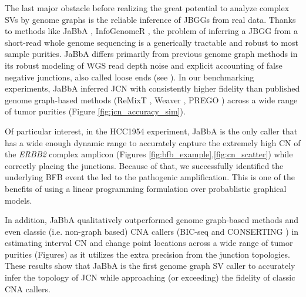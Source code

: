\documentclass[phd,tocprelim]{cornell}
\begin{document}

The last major obstacle before realizing the great potential to analyze complex SVs by genome graphs is the reliable inference of JBGGs from real data. Thanks to methods like JaBbA \cite{Hadi2020-um}, InfoGenomeR \cite{Lee2021-rl}, the problem of inferring a JBGG from a short-read whole genome sequencing is a generically tractable and robust to most sample purities. JaBbA differs primarily from previous genome graph methods in its robust modeling of WGS read depth noise and explicit accounting of false negative junctions, also called loose ends (see ). In our benchmarking experiments, JaBbA inferred JCN with consistently higher fidelity than published genome graph-based methods (ReMixT \cite{McPherson2017-ry}, Weaver \cite{Li2016-qa}, PREGO \cite{Oesper2012-vw}) across a wide range of tumor purities (Figure \ref{fig:jcn_accuracy_sim}).

Of particular interest, in the HCC1954 experiment, JaBbA is the only caller that has a wide enough dynamic range to accurately capture the extremely high CN of the \textit{ERBB2} complex amplicon (Figures \ref{fig:bfb_example},\ref{fig:cn_scatter}) while correctly placing the junctions. Because of that, we successfully identified the underlying BFB event the led to the pathogenic amplification. This is one of the benefits of using a linear programming formulation over probablistic graphical models.

In addition, JaBbA qualitatively outperformed genome graph-based methods and even classic (i.e. non-graph based) CNA callers (BIC-seq \cite{Xi2011-oa} and CONSERTING \cite{Chen2015-sw}) in estimating interval CN and change point locations across a wide range of tumor purities (Figures) as it utilizes the extra precision from the junction topologies. These results show that JaBbA is the first genome graph SV caller to accurately infer the topology of JCN while approaching (or exceeding) the fidelity of classic CNA callers.
\end{document}
